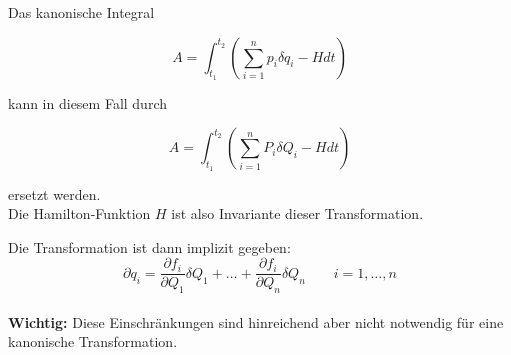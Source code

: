 \begin{frame}
    Das kanonische Integral 
    
    \begin{displaymath}
    A = \int_{t_1}^{t_2} \left( \sum_{i=1}^n p_i \delta q_i - H dt \right) 
    \end{displaymath}
    
    kann in diesem Fall durch
    
    \begin{displaymath}
    A = \int_{t_1}^{t_2} \left( \sum_{i=1}^n P_i \delta Q_i - H dt \right) 
    \end{displaymath}
    
    ersetzt werden. \\
    \vspace{5mm}
    Die Hamilton-Funktion $H$ ist also Invariante dieser Transformation.
    
\end{frame}


\begin{frame}
   Die Transformation ist dann implizit gegeben:\\

    \begin{displaymath}
        \partial q_i = \frac{\partial f_i}{\partial Q_1} \delta Q_1 + \ldots +  \frac{\partial f_i}{\partial Q_n} \delta Q_n \qquad i=1,\ldots,n
    \end{displaymath} \\
   \vspace{5mm}      
    \textbf{Wichtig:} Diese Einschränkungen sind hinreichend aber nicht notwendig für eine kanonische Transformation.
\end{frame}
